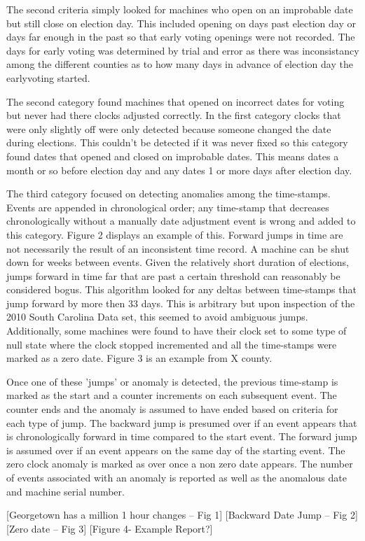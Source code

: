 The second criteria simply looked for machines who open on an improbable date but still close on election day.  This included opening on days past election day or days far enough in the past so that early voting openings were not recorded. The days for early voting was determined by trial and error as there was inconsistancy among the different counties as to how many days in advance of election day the earlyvoting started.

The second category found machines that opened on incorrect dates for voting but never had there clocks adjusted correctly.  In the first category clocks that were only slightly off were only detected because someone changed the date during elections.  This couldn't be detected if it was never fixed so this category found dates that opened and closed on improbable dates.  This means dates a month or so before election day and any dates 1 or more days after election day.

The third category focused on detecting anomalies among the time-stamps.  Events are appended in chronological order; any time-stamp that decreases chronologically without a manually date adjustment event is wrong and added to this category. Figure 2 displays an example of this.  Forward jumps in time are not necessarily the result of an inconsistent time record.  A machine can be shut down for weeks between events.  Given the relatively short duration of elections, jumps forward in time far that are past a certain threshold can reasonably be considered bogus.  This algorithm looked for any deltas between time-stamps that jump forward by more then 33 days.  This is arbitrary but upon inspection of the 2010 South Carolina Data set, this seemed to avoid ambiguous jumps.  Additionally, some machines were found to have their clock set to some type of null state where the clock stopped incremented and all the time-stamps were marked as a zero date.  Figure 3 is an example from X county.

Once one of these 'jumps' or anomaly is detected, the previous  time-stamp is marked  as the start and a counter increments on each subsequent event.  The counter ends and the anomaly is assumed to have ended based on criteria for each type of jump. The backward jump is presumed over if an event appears that is chronologically forward in time compared to the start event.  The forward jump is assumed over if an event appears on the same day of the starting event.  The zero clock anomaly is marked as over once a non zero date appears. The number of events associated with an anomaly is reported as well as the anomalous date and machine serial number. 


[Georgetown has a million 1 hour changes – Fig 1]
[Backward Date Jump – Fig 2]
[Zero date – Fig 3]
[Figure 4- Example Report?]
